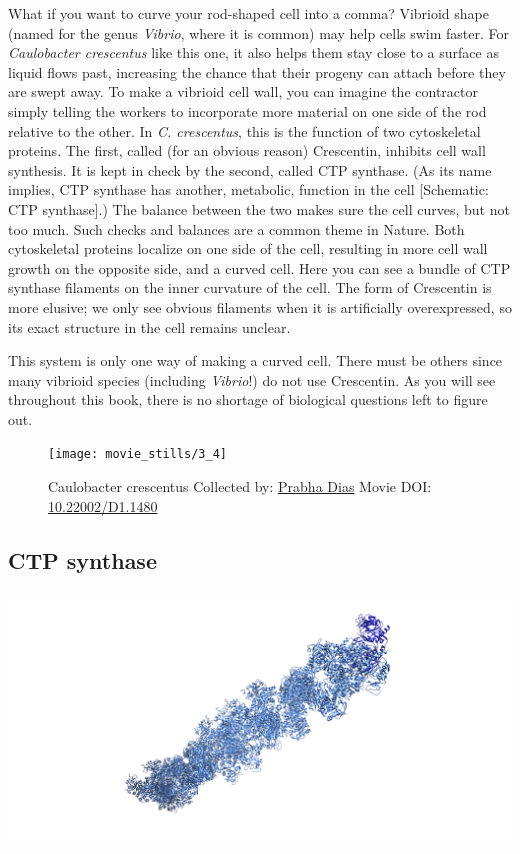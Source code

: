 \documentclass[]{tufte-book}
\begin{document}
What if you want to curve your rod-shaped cell into a comma? Vibrioid
shape (named for the genus \emph{Vibrio}, where it is common) may help
cells swim faster. For \emph{Caulobacter crescentus} like this one, it
also helps them stay close to a surface as liquid flows past, increasing
the chance that their progeny can attach before they are swept away. To
make a vibrioid cell wall, you can imagine the contractor simply telling
the workers to incorporate more material on one side of the rod relative
to the other. In \emph{C. crescentus}, this is the function of two
cytoskeletal proteins. The first, called (for an obvious reason)
Crescentin, inhibits cell wall synthesis. It is kept in check by the
second, called CTP synthase. (As its name implies, CTP synthase has
another, metabolic, function in the cell {[}Schematic: CTP synthase{]}.)
The balance between the two makes sure the cell curves, but not too
much. Such checks and balances are a common theme in Nature. Both
cytoskeletal proteins localize on one side of the cell, resulting in
more cell wall growth on the opposite side, and a curved cell. Here you
can see a bundle of CTP synthase filaments on the inner curvature of the
cell. The form of Crescentin is more elusive; we only see obvious
filaments when it is artificially overexpressed, so its exact structure
in the cell remains unclear.

This system is only one way of making a curved cell. There must be
others since many vibrioid species (including \emph{Vibrio}!) do not use
Crescentin. As you will see throughout this book, there is no shortage
of biological questions left to figure out.





\begin{figure}
\texttt{[image: movie\_stills/3\_4]} \caption[Caulobacter crescentus Collected by:
\protect\hyperlink{prabha_dias}{Prabha Dias} Movie DOI:
\href{https://doi.org/10.22002/D1.1480}{10.22002/D1.1480}]{Caulobacter crescentus Collected by:
\protect\hyperlink{prabha_dias}{Prabha Dias} Movie DOI:
\href{https://doi.org/10.22002/D1.1480}{10.22002/D1.1480}}\label{fig:3-4}
\end{figure}

\subsection{CTP synthase}\label{CTP_synthase}

\includegraphics{img/schematics/3_4_1}
\end{document}
